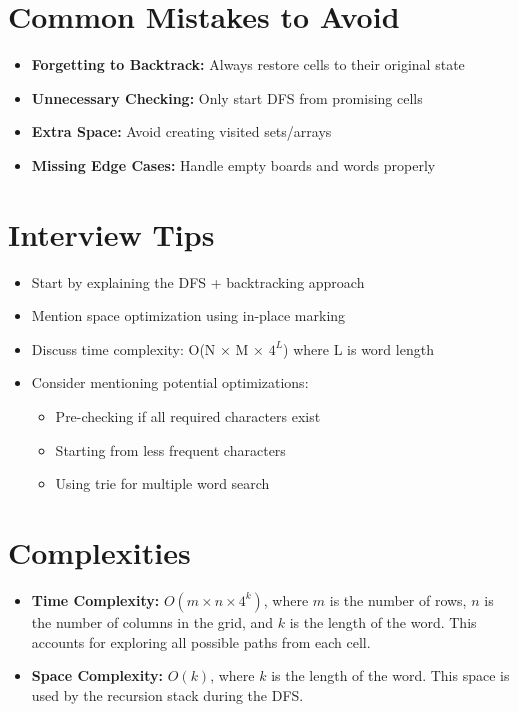 \section*{Common Mistakes to Avoid}
\begin{itemize}
    \item \textbf{Forgetting to Backtrack:} Always restore cells to their original state
    \item \textbf{Unnecessary Checking:} Only start DFS from promising cells
    \item \textbf{Extra Space:} Avoid creating visited sets/arrays
    \item \textbf{Missing Edge Cases:} Handle empty boards and words properly
\end{itemize}

\section*{Interview Tips}
\begin{itemize}
    \item Start by explaining the DFS + backtracking approach
    \item Mention space optimization using in-place marking
    \item Discuss time complexity: O(N × M × $4^L$) where L is word length
    \item Consider mentioning potential optimizations:
        \begin{itemize}
            \item Pre-checking if all required characters exist
            \item Starting from less frequent characters
            \item Using trie for multiple word search
        \end{itemize}
\end{itemize}

\section*{Complexities}

\begin{itemize}
    \item \textbf{Time Complexity:} \(O(m \times n \times 4^k)\), where \(m\) is the number of rows, \(n\) is the number of columns in the grid, and \(k\) is the length of the word. This accounts for exploring all possible paths from each cell.
    \item \textbf{Space Complexity:} \(O(k)\), where \(k\) is the length of the word. This space is used by the recursion stack during the DFS.
\end{itemize}

